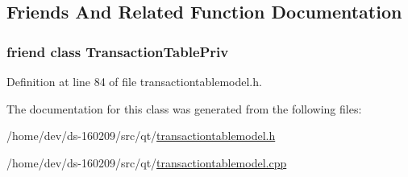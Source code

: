 \subsection{Friends And Related Function Documentation}
\hypertarget{class_transaction_table_model_a39d3ddddb3af12905ad5538a91753736}{}
\subsubsection[{Transaction\+Table\+Priv}]{\setlength{\rightskip}{0pt plus 5cm}friend class {\bf Transaction\+Table\+Priv}\hspace{0.3cm}{\ttfamily [friend]}}\label{class_transaction_table_model_a39d3ddddb3af12905ad5538a91753736}


Definition at line 84 of file transactiontablemodel.\+h.



The documentation for this class was generated from the following files\+:\begin{DoxyCompactItemize}
\item 
/home/dev/ds-\/160209/src/qt/\hyperlink{transactiontablemodel_8h}{transactiontablemodel.\+h}\item 
/home/dev/ds-\/160209/src/qt/\hyperlink{transactiontablemodel_8cpp}{transactiontablemodel.\+cpp}\end{DoxyCompactItemize}
